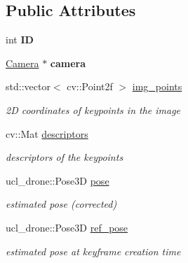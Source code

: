 \subsection*{Public Attributes}
\begin{DoxyCompactItemize}
\item 
\mbox{\label{classKeyframe_a59745dde6f8cf868532836970418d17a}} 
int {\bfseries ID}
\item 
\mbox{\label{classKeyframe_a0645f53861bebd175e92f3d7f8b6f1aa}} 
\hyperlink{structCamera}{Camera} $\ast$ {\bfseries camera}
\item 
\mbox{\label{classKeyframe_afbc4fb3b5a84ad500a5b705b93a76a8c}} 
std\+::vector$<$ cv\+::\+Point2f $>$ \hyperlink{classKeyframe_afbc4fb3b5a84ad500a5b705b93a76a8c}{img\+\_\+points}
\begin{DoxyCompactList}\small\item\em 2D coordinates of keypoints in the image \end{DoxyCompactList}\item 
\mbox{\label{classKeyframe_a6b63cc72bb999189e39cb6b50a32db17}} 
cv\+::\+Mat \hyperlink{classKeyframe_a6b63cc72bb999189e39cb6b50a32db17}{descriptors}
\begin{DoxyCompactList}\small\item\em descriptors of the keypoints \end{DoxyCompactList}\item 
\mbox{\label{classKeyframe_afd0e8ae2f68a2f53faba80b51d3534b5}} 
ucl\+\_\+drone\+::\+Pose3D \hyperlink{classKeyframe_afd0e8ae2f68a2f53faba80b51d3534b5}{pose}
\begin{DoxyCompactList}\small\item\em estimated pose (corrected) \end{DoxyCompactList}\item 
\mbox{\label{classKeyframe_a307c0a3860d8796d4b4568b611a484d7}} 
ucl\+\_\+drone\+::\+Pose3D \hyperlink{classKeyframe_a307c0a3860d8796d4b4568b611a484d7}{ref\+\_\+pose}
\begin{DoxyCompactList}\small\item\em estimated pose at keyframe creation time \end{DoxyCompactList}\item 

\end{DoxyCompactItemize}
